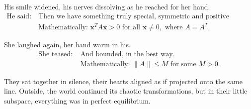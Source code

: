 \documentclass{article}
\begin{document}
His smile widened, his nerves dissolving as he reached for her hand.
\begin{align*}
    \text{He said: } & \text{Then we have something truly special, symmetric and positive definite.}                                     \\
                     & \text{Mathematically: } \mathbf{x}^T A \mathbf{x} > 0 \text{ for all } \mathbf{x} \neq 0, \text{ where } A = A^T.
\end{align*}

She laughed again, her hand warm in his.
\begin{align*}
    \text{She teased: } & \text{And bounded, in the best way.}                          \\
                        & \text{Mathematically: } \|A\| \leq M \text{ for some } M > 0.
\end{align*}

They sat together in silence, their hearts aligned as if projected onto the same line. Outside, the world continued its chaotic transformations, but in their little subspace, everything was in perfect equilibrium.
\end{document}
